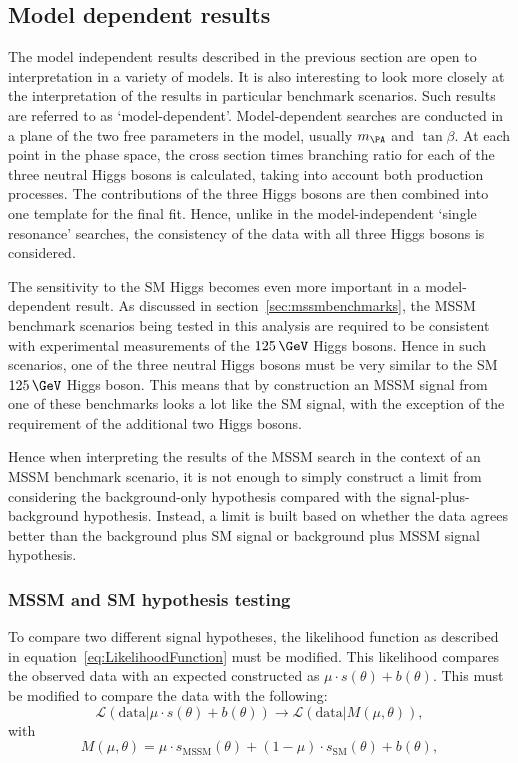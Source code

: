 \subsection{Model dependent results}
\label{sec:modeldependent}

The model independent results described in the previous section are open to
interpretation in a variety of models. It is also interesting to look more
closely at the interpretation of the results in particular benchmark scenarios.
Such results are referred to as `model-dependent'. Model-dependent searches are
conducted in a plane of the two free parameters in the model, usually $m_{\PA}$
and $\tan\beta$. At each point in the phase space, the cross section times
branching ratio for each of the three neutral Higgs bosons is calculated, taking
into account both production processes. The contributions of the three Higgs
bosons are then combined into one template for the final fit. Hence, unlike in the
model-independent `single resonance' searches, the consistency of the data with
all three Higgs bosons is considered. 

The sensitivity to the \ac{SM} Higgs becomes even more important in a
model-dependent result. As discussed in
section~\ref{sec:mssmbenchmarks}, the \ac{MSSM} benchmark scenarios being tested in this
analysis are required to be consistent with experimental measurements of the
$125\,\GeV$ Higgs bosons. Hence in such scenarios, one of the three neutral Higgs
bosons must be very similar to the \ac{SM} $125\,\GeV$ Higgs boson. This means
that by construction an \ac{MSSM} signal from one of these benchmarks looks a
lot like the \ac{SM} signal, with the exception of the requirement of the
additional two Higgs bosons.

Hence when interpreting the results of the \ac{MSSM} search in the context of an
\ac{MSSM} benchmark scenario, it is not enough to simply construct a limit from
considering the background-only hypothesis compared with the
signal-plus-background hypothesis. Instead, a limit is built based on
whether the data agrees better than the background plus \ac{SM} signal or
background plus \ac{MSSM} signal hypothesis.

\subsubsection{MSSM and SM hypothesis testing}

To compare two different signal hypotheses, the likelihood function as described
in equation~\ref{eq:LikelihoodFunction} must be modified. This likelihood compares 
the observed data with an expected constructed as
$\mu \cdot s(\theta) + b(\theta)$. This must be modified to compare the data with the
following:
\begin{equation}
\mathcal{L}(\text{data} | \mu \cdot s(\theta) + b(\theta)) \rightarrow
\mathcal{L}(\text{data} | M(\mu,\theta)),
\end{equation}
with
\begin{equation}
M(\mu,\theta) = \mu \cdot s_{\text{MSSM}}(\theta) + (1-\mu) \cdot
s_{\text{SM}}(\theta) + b(\theta), 
\end{equation}

